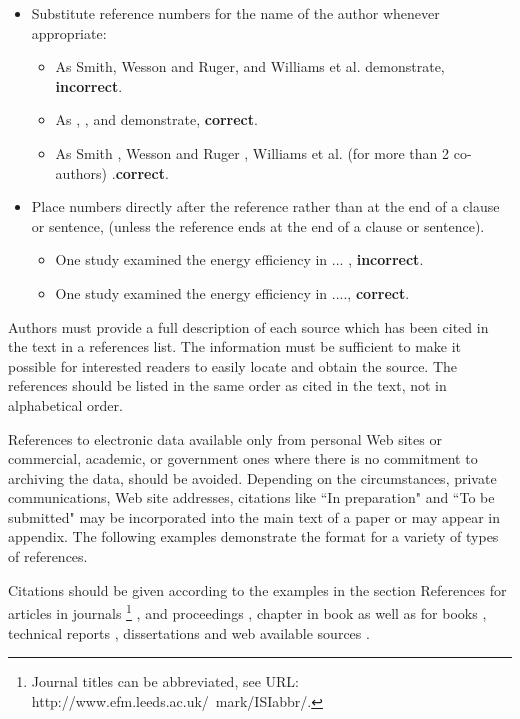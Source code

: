 \documentclass{ECOS_2021}
\begin{document}
\begin{itemize}
    \item Substitute reference numbers for the name of the author whenever appropriate:
    \begin{itemize}
        \item As Smith, Wesson and Ruger, and Williams et al. demonstrate, {\bf incorrect}.
        \item As \cite{journal}, \cite{proceedings}, and \cite{chapter} demonstrate, {\bf correct}.
        \item As Smith \cite{journal}, Wesson and Ruger \cite{proceedings}, Williams et al. (for more than 2 co-authors) \cite{chapter}.{\bf correct}.
    \end{itemize}
    \item Place numbers directly after the reference rather than at the end of a clause or sentence, (unless the reference ends at the end of a clause or sentence).
    \begin{itemize}
        \item One study examined the energy efficiency in ... \cite{journal}, {\bf incorrect}.
        \item One study \cite{journal} examined the energy efficiency in ...., {\bf correct}.
    \end{itemize}
\end{itemize}

Authors must provide a full description of each source which has been cited in the text in a references list. The information must be sufficient to make it possible for interested readers to easily locate and obtain the source. The references should be listed in the same order as cited in the text, not in alphabetical order.

References to electronic data available only from personal Web sites or commercial, academic, or government ones where there is no commitment to archiving the data, should be avoided. Depending on the circumstances, private communications, Web site addresses, citations like ``In preparation" and ``To be submitted" may be incorporated into the main text of a paper or may appear in appendix. The following examples demonstrate the format for a variety of types of references.

Citations should be given according to the examples in the section References for articles in journals \footnote{Journal titles can be abbreviated, see URL: http://www.efm.leeds.ac.uk/~mark/ISIabbr/.} \cite{journal}, \cite{journal2} and proceedings \cite{proceedings}, chapter in book \cite{chapter} as well as for books \cite{books}, technical reports \cite{report}, dissertations \cite{dissertation} and web available sources \cite{web_references}.

\sffamily \Large
\rmfamily \normalsize


\end{document}
